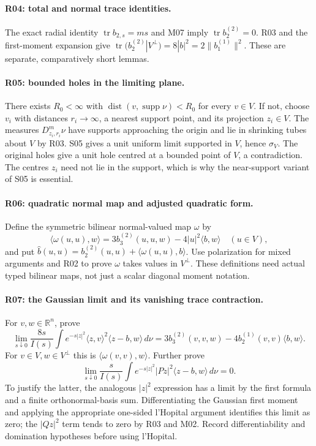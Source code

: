 \paragraph{R04: total and normal trace identities.}
The exact radial identity $\operatorname{tr}b_{2,s}=ms$ and M07 imply
$\operatorname{tr}b_2^{(2)}=0$.
R03 and the first-moment expansion give
$\operatorname{tr}(b_2^{(2)}|V^\perp)=8|b|^2
=2\|b_1^{(1)}\|^2$.
These are separate, comparatively short lemmas.

\paragraph{R05: bounded holes in the limiting plane.}
There exists $R_0<\infty$ with
$\operatorname{dist}(v,\operatorname{supp}\nu)<R_0$ for every $v\in V$.
If not, choose $v_i$ with distances $r_i\to\infty$, a nearest support point,
and its projection $z_i\in V$. The measures $D^m_{z_i,r_i}\nu$ have
supports approaching the origin and lie in shrinking tubes about $V$ by R03.
S05 gives a unit uniform limit supported in $V$, hence $\sigma_V$.
The original holes give a unit hole centred at a bounded point of $V$, a
contradiction. The centres $z_i$ need not lie in the support, which is why the
near-support variant of S05 is essential.

\paragraph{R06: quadratic normal map and adjusted quadratic form.}
Define the symmetric bilinear normal-valued map $\omega$ by
\[
 \langle\omega(u,u),w\rangle
 =3b_3^{(2)}(u,u,w)-4|u|^2\langle b,w\rangle\quad(u\in V),
\]
and put $\widehat b(u,u)=b_2^{(2)}(u,u)+\langle\omega(u,u),b\rangle$.
Use polarization for mixed arguments and R02 to prove $\omega$ takes values
in $V^\perp$. These definitions need actual typed bilinear maps, not just a
scalar diagonal moment notation.

\paragraph{R07: the Gaussian limit and its vanishing trace contraction.}
For $v,w\in\mathbb R^n$, prove
\[
 \lim_{s\downarrow0}\frac{8s}{I(s)}\int e^{-s|z|^2}
 \langle z,v\rangle^2\langle z-b,w\rangle\,d\nu
 =3b_3^{(2)}(v,v,w)-4b_2^{(1)}(v,v)\langle b,w\rangle.
\]
For $v\in V,w\in V^\perp$ this is $\langle\omega(v,v),w\rangle$.
Further prove
\[
 \lim_{s\downarrow0}\frac{s}{I(s)}\int e^{-s|z|^2}
 |Pz|^2\langle z-b,w\rangle\,d\nu=0.
\]
To justify the latter, the analogous $|z|^2$ expression has a limit by the
first formula and a finite orthonormal-basis sum. Differentiating the Gaussian
first moment and applying the appropriate one-sided l'Hopital argument
identifies this limit as zero; the $|Qz|^2$ term tends to zero by R03 and M02.
Record differentiability and domination hypotheses before using l'Hopital.

